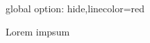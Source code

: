 \documentclass{article}
\begin{document}
\tTitle{}
{global option: hide,linecolor=red}


Lorem
impsum
\end{document}
